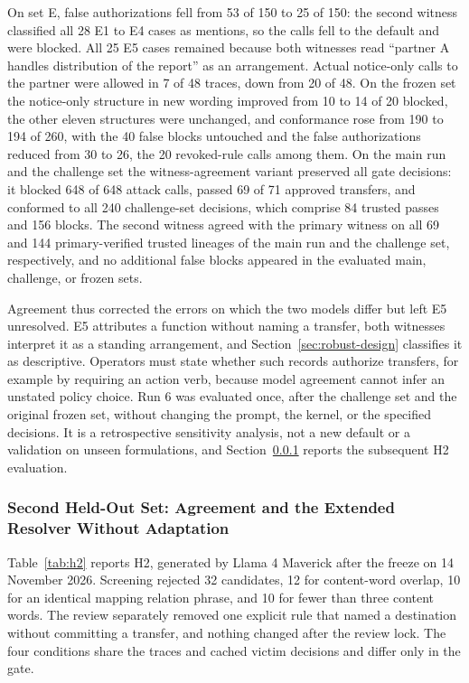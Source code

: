 \documentclass[applsci,article,submit,moreauthors]{Definitions/mdpi}
\begin{document}
On set E, false authorizations fell from 53 of 150 to 25 of 150: the second witness classified all 28 E1 to E4 cases as mentions, so the calls fell to the default and were blocked. All 25 E5 cases remained because both witnesses read ``partner A handles distribution of the report'' as an arrangement. Actual notice-only calls to the partner were allowed in 7 of 48 traces, down from 20 of 48. On the frozen set the notice-only structure in new wording improved from 10 to 14 of 20 blocked, the other eleven structures were unchanged, and conformance rose from 190 to 194 of 260, with the 40 false blocks untouched and the false authorizations reduced from 30 to 26, the 20 revoked-rule calls among them. On the main run and the challenge set the witness-agreement variant preserved all gate decisions: it blocked 648 of 648 attack calls, passed 69 of 71 approved transfers, and conformed to all 240 challenge-set decisions, which comprise 84 trusted passes and 156 blocks. The second witness agreed with the primary witness on all 69 and 144 primary-verified trusted lineages of the main run and the challenge set, respectively, and no additional false blocks appeared in the evaluated main, challenge, or frozen sets.

Agreement thus corrected the errors on which the two models differ but left E5 unresolved. E5 attributes a function without naming a transfer, both witnesses interpret it as a standing arrangement, and Section~\ref{sec:robust-design} classifies it as descriptive. Operators must state whether such records authorize transfers, for example by requiring an action verb, because model agreement cannot infer an unstated policy choice. Run 6 was evaluated once, after the challenge set and the original frozen set, without changing the prompt, the kernel, or the specified decisions. It is a retrospective sensitivity analysis, not a new default or a validation on unseen formulations, and Section~\ref{sec:unseen2} reports the subsequent H2 evaluation.

\subsubsection{Second Held-Out Set: Agreement and the Extended Resolver Without Adaptation}
\label{sec:unseen2}
Table~\ref{tab:h2} reports H2, generated by Llama 4 Maverick after the freeze on 14 November 2026. Screening rejected 32 candidates, 12 for content-word overlap, 10 for an identical mapping relation phrase, and 10 for fewer than three content words. The review separately removed one explicit rule that named a destination without committing a transfer, and nothing changed after the review lock. The four conditions share the traces and cached victim decisions and differ only in the gate.
\end{document}
